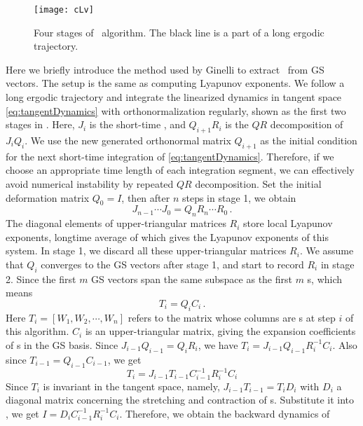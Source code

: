 \begin{figure}
  \centering
  \texttt{[image: cLv]}
  \caption[Four stages of \cLv\ algorithm]
  {Four stages of \cLv\ algorithm.
    The black line is a part of
    a long ergodic trajectory.}
  \label{fig:CLV}
\end{figure}
Here we briefly introduce the method used by
Ginelli \etal{}
to extract
\cLvs\ from GS vectors. The setup is the same as computing Lyapunov
exponents. We follow a long ergodic trajectory and integrate
the linearized dynamics in tangent space \eqref{eq:tangentDynamics}
with orthonormalization regularly, shown as the first two stages in
.
Here, $J_i$ is the short-time \JacobianM,
and $Q_{i+1}R_i$ is the $QR$ decomposition of $J_iQ_i$.
We use the new generated orthonormal matrix $Q_{i+1}$ as the initial condition
for the next short-time integration of \eqref{eq:tangentDynamics}.
Therefore, if we choose an appropriate time length of each integration segment,
we can effectively avoid numerical instability by repeated $QR$ decomposition.
Set the initial
deformation matrix $Q_0 = I$, then after $n$ steps in stage 1, we obtain
\[
  J_{n-1}\cdots J_0 = Q_n R_n\cdots R_0
  \,.
\]
The diagonal elements
of upper-triangular
matrices $R_i$ store local
Lyapunov exponents, longtime average of which gives the Lyapunov
exponents of this system. In stage 1, we discard all these
upper-triangular matrices $R_i$. We assume that $Q_i$ converges
to the GS vectors after stage 1, and start to record $R_i$ in
stage 2. Since the first $m$ GS vectors span the same subspace as the
first $m$ \cLv s, which means
\begin{equation}
  \label{eq:cv_T}
  T_i = Q_iC_i
  \,.
\end{equation}
Here $T_i = [W_1, W_2,\cdots, W_n]$ refers to the matrix whose columns
are \cLv s at step $i$ of this algorithm.
$C_i$ is an upper-triangular matrix, giving the expansion
coefficients of \cLv s in the GS basis. Since $J_{i-1}Q_{i-1}=Q_iR_i$,
we have $T_i = J_{i-1} Q_{i-1} R^{-1}_{i}C_i$.
Also since $T_{i-1} = Q_{i-1}C_{i-1}$, we get
\begin{equation}
  \label{eq:cv_T2}
  T_{i} = J_{i-1}T_{i-1}C_{i-1}^{-1}R^{-1}_{i}C_i
\end{equation}
Since $T_i$ is invariant in the
tangent space, namely, $J_{i-1}T_{i-1}=T_iD_i$ with
$D_i$ a diagonal matrix concerning the stretching and
contraction of \cLv s. Substitute it into , we get
$I = D_iC_{i-1}^{-1}R^{-1}_{i}C_i$. Therefore,
we obtain the backward dynamics of
